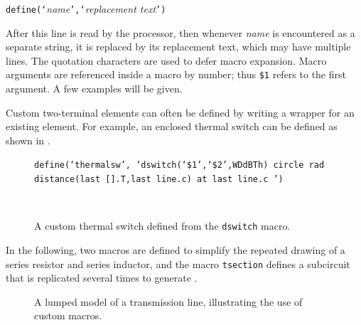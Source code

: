 {\tt define(`}{\sl name}{\tt',`}{\sl replacement text}{\tt ')}

After this line is read by the \Mfour processor, then whenever {\sl name}
is encountered as a separate string, it is replaced by its replacement
text, which may have multiple lines.  The quotation characters are used
to defer macro expansion.  Macro arguments are referenced inside a
macro by number; thus {\tt \$1} refers to the first argument.
A few examples will be given.

Custom two-terminal elements can often be defined by writing a wrapper
for an existing element.  For example, an enclosed thermal switch
can be defined as shown in .
\begin{figure}[ht]
   \parbox{5in}{\tt define(`thermalsw',\hfill\break
   \hbox{}\space`dswitch(`\$1',`\$2',WDdBTh)\hfill\break
   \hbox{}\space\space circle rad distance(last [].T,last line.c)
     at last line.c ') }%
   \hfill\raise-0.15in\hbox{ }
   \caption{A custom thermal switch defined from the {\tt dswitch} macro.}
   \label{Thermal}
   \end{figure}

In the following,
two macros are defined to simplify the repeated drawing
of a series resistor and series inductor, and the macro {\tt tsection} defines
a subcircuit that is replicated several times to generate .
\pagebreak
{\small }
\begin{figure}[h!t]
   
   \caption{A lumped model of a transmission line, illustrating the
    use of custom macros.}
   \label{Tline}
   \end{figure}

